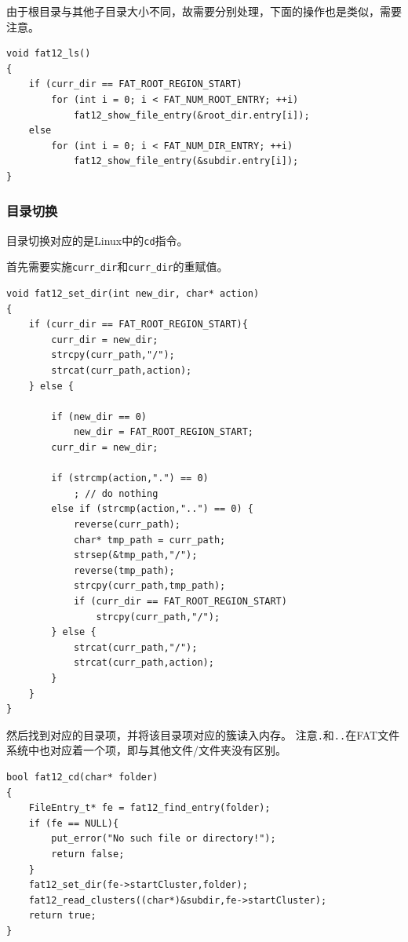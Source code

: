 \documentclass[logo,reportComp]{thesis}
\begin{document}
由于根目录与其他子目录大小不同，故需要分别处理，下面的操作也是类似，需要注意。
\begin{lstlisting}
void fat12_ls()
{
	if (curr_dir == FAT_ROOT_REGION_START)
		for (int i = 0; i < FAT_NUM_ROOT_ENTRY; ++i)
			fat12_show_file_entry(&root_dir.entry[i]);
	else
		for (int i = 0; i < FAT_NUM_DIR_ENTRY; ++i)
			fat12_show_file_entry(&subdir.entry[i]);
}
\end{lstlisting}

\subsubsection{目录切换}
目录切换对应的是Linux中的\verb'cd'指令。

首先需要实施\verb'curr_dir'和\verb'curr_dir'的重赋值。
\begin{lstlisting}
void fat12_set_dir(int new_dir, char* action)
{
	if (curr_dir == FAT_ROOT_REGION_START){
		curr_dir = new_dir;
		strcpy(curr_path,"/");
		strcat(curr_path,action);
	} else {

		if (new_dir == 0)
			new_dir = FAT_ROOT_REGION_START;
		curr_dir = new_dir;

		if (strcmp(action,".") == 0)
			; // do nothing
		else if (strcmp(action,"..") == 0) {
			reverse(curr_path);
			char* tmp_path = curr_path;
			strsep(&tmp_path,"/");
			reverse(tmp_path);
			strcpy(curr_path,tmp_path);
			if (curr_dir == FAT_ROOT_REGION_START)
				strcpy(curr_path,"/");
		} else {
			strcat(curr_path,"/");
			strcat(curr_path,action);
		}
	}
}
\end{lstlisting}

然后找到对应的目录项，并将该目录项对应的簇读入内存。
注意\verb'.'和\verb'..'在FAT文件系统中也对应着一个项，即与其他文件/文件夹没有区别。
\begin{lstlisting}
bool fat12_cd(char* folder)
{
	FileEntry_t* fe = fat12_find_entry(folder);
	if (fe == NULL){
		put_error("No such file or directory!");
		return false;
	}
	fat12_set_dir(fe->startCluster,folder);
	fat12_read_clusters((char*)&subdir,fe->startCluster);
	return true;
}
\end{lstlisting}
\end{document}
